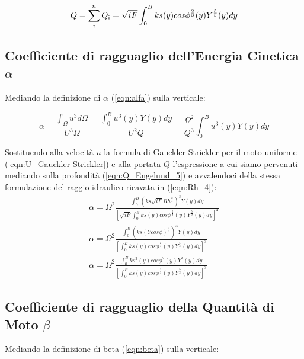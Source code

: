 \documentclass[12pt]{article} %
\begin{document}
\begin{equation}
   Q=\sum_i^n Q\textsubscript{i}=\sqrt{iF}\int_{0}^{B} ks(y)cos\phi^{\frac{2}{3}}(y)Y^{\frac{5}{3}}(y)dy
    \label{eqn:Q_Engelund_5}
\end{equation}

\subsection{\texorpdfstring{Coefficiente di ragguaglio dell’Energia Cinetica $\alpha$}{}}

\noindent Mediando la definizione di $\alpha$ (\ref{eqn:alfa}) sulla verticale:

\begin{equation}
    \alpha=\frac{\int_{\Omega}^{} u^{3}d\Omega}{U^{3}\Omega}=\frac{\int_{0}^{B} u^{3}(y)Y(y)dy}{U^{2}Q}=\frac{\Omega^{2}}{Q^{3}}\int_{0}^{B}u^{3}(y)Y(y)dy
    \label{eqn:alfa_Engelund_1}
\end{equation}

\noindent Sostituendo alla velocità $u$ la formula di Gauckler-Strickler per il moto uniforme (\ref{eqn:U_Gauckler-Strickler}) e alla portata $Q$ l’espressione a cui siamo pervenuti mediando sulla profondità (\ref{eqn:Q_Engelund_5}) e avvalendoci della stessa formulazione del raggio idraulico ricavata in (\ref{eqn:Rh_4}):
\begin{equation}
    \begin{gathered}
        \alpha=\Omega^{2}\frac{\int_{0}^{B}\left(ks\sqrt{iF}Rh^{\frac{2}{3}}\right)^{3}Y(y)dy}{[\sqrt{iF}\int_{0}^{B} ks(y)cos\phi^{\frac{2}{3}}(y)Y^{\frac{5}{3}}(y)dy]^{3}}
        \\
        \alpha=\Omega^{2}\frac{\int_{0}^{B}\left(ks(Ycos\phi)^{\frac{2}{3}}\right)^{3}Y(y)dy}{[\int_{0}^{B} ks(y)cos\phi^{\frac{2}{3}}(y)Y^{\frac{5}{3}}(y)dy]^{3}}
        \\
        \alpha=\Omega^{2}\frac{\int_{0}^{B}ks^3(y)cos\phi^{2}(y)Y^{3}(y)dy}{[\int_{0}^{B} ks(y)cos\phi^{\frac{2}{3}}(y)Y^{\frac{5}{3}}(y)dy]^{3}}
    \end{gathered}
    \label{eqn:alfa_Engelund_2}
\end{equation}

\subsection{\texorpdfstring{Coefficiente di ragguaglio della Quantità di Moto $\beta$}{}}

\noindent Mediando la definizione di beta (\ref{eqn:beta}) sulla verticale:
\end{document}
